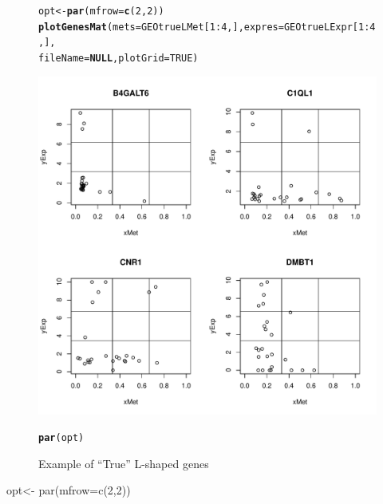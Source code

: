 \documentclass[a4paper,10pt]{article}\usepackage[]{graphicx}\usepackage[]{color}
\makeatletter
\def\maxwidth{ %
  \ifdim\Gin@nat@width>\linewidth
    \linewidth
  \else
    \Gin@nat@width
  \fi
}
\newcommand{\hlnum}[1]{\textcolor[rgb]{0.686,0.059,0.569}{#1}}%
\newcommand{\hlopt}[1]{\textcolor[rgb]{0,0,0}{#1}}%
\newcommand{\hlstd}[1]{\textcolor[rgb]{0.345,0.345,0.345}{#1}}%
\newcommand{\hlkwa}[1]{\textcolor[rgb]{0.161,0.373,0.58}{\textbf{#1}}}%
\newcommand{\hlkwb}[1]{\textcolor[rgb]{0.69,0.353,0.396}{#1}}%
\newcommand{\hlkwc}[1]{\textcolor[rgb]{0.333,0.667,0.333}{#1}}%
\newcommand{\hlkwd}[1]{\textcolor[rgb]{0.737,0.353,0.396}{\textbf{#1}}}%
\newenvironment{kframe}{%
 \def\at@end@of@kframe{}%
 \ifinner\ifhmode%
  \def\at@end@of@kframe{\end{minipage}}%
  \begin{minipage}{\columnwidth}%
 \fi\fi%
 \def\FrameCommand##1{\hskip\@totalleftmargin \hskip-\fboxsep
 \colorbox{shadecolor}{##1}\hskip-\fboxsep
     \hskip-\linewidth \hskip-\@totalleftmargin \hskip\columnwidth}%
 \MakeFramed {\advance\hsize-\width
   \@totalleftmargin\z@ \linewidth\hsize
   \@setminipage}}%
 {\par\unskip\endMakeFramed%
 \at@end@of@kframe}
\newenvironment{knitrout}{}{} %
\makeatother
\begin{document}
\begin{figure}
\centering
\begin{knitrout}
\color{fgcolor}\begin{kframe}
\begin{alltt}
\hlstd{opt}\hlkwb{<-} \hlkwd{par}\hlstd{(}\hlkwc{mfrow}\hlstd{=}\hlkwd{c}\hlstd{(}\hlnum{2}\hlstd{,}\hlnum{2}\hlstd{))}
\hlkwd{plotGenesMat} \hlstd{(}\hlkwc{mets}\hlstd{=GEOtrueLMet[}\hlnum{1}\hlopt{:}\hlnum{4}\hlstd{,],} \hlkwc{expres}\hlstd{=GEOtrueLExpr[}\hlnum{1}\hlopt{:}\hlnum{4}\hlstd{,],}
               \hlkwc{fileName}\hlstd{=}\hlkwa{NULL}\hlstd{,} \hlkwc{plotGrid} \hlstd{=} \hlnum{TRUE}\hlstd{)}
\end{alltt}
\end{kframe}
\includegraphics[width=\maxwidth]{figure/plotTRUE2-1} 
\begin{kframe}\begin{alltt}
\hlkwd{par}\hlstd{(opt)}
\end{alltt}
\end{kframe}
\end{knitrout}
\caption{Example of ``True'' L-shaped genes\label{Lshaped12}}
\end{figure}opt<- par(mfrow=c(2,2))
\end{document}
